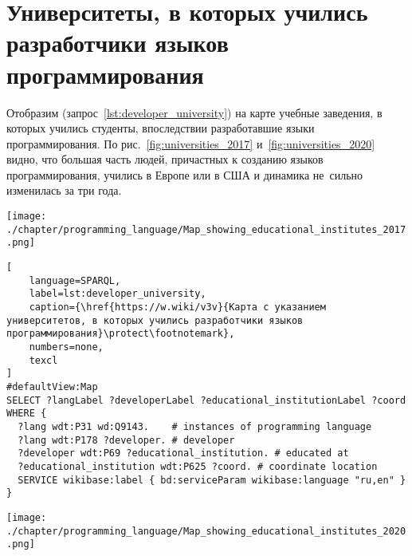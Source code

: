 \section{Университеты, в которых учились разработчики языков программирования}


Отобразим (запрос~\ref{lst:developer_university}) на карте учебные заведения, в которых учились студенты, впоследствии разработавшие языки программирования.
По рис.~\ref{fig:universities_2017} и~\ref{fig:universities_2020} видно, что большая часть людей, причастных к созданию языков программирования, учились в Европе или в США и динамика не~сильно изменилась за три года.
%
\begin{marginfigure}[3\baselineskip]
\centering
	\texttt{[image: ./chapter/programming\_language/Map\_showing\_educational\_institutes\_2017.png]}
	\caption[Учебные заведения, в которых учились разработчики языков программирования, 2017 год.]{Учебные заведения, в которых учились разработчики языков программирования, 2017 год. Ссылка на SPARQL-запрос: \href{https://w.wiki/uGb}{https://w.wiki/uGb}}
	\label{fig:universities_2017}
\end{marginfigure}


\begin{lstlisting}[
	language=SPARQL,
	label=lst:developer_university,
	caption={\href{https://w.wiki/v3v}{Карта с указанием университетов, в которых учились разработчики языков программирования}\protect\footnotemark},
    numbers=none,
	texcl
]
#defaultView:Map
SELECT ?langLabel ?developerLabel ?educational_institutionLabel ?coord 
WHERE {
  ?lang wdt:P31 wd:Q9143.    # instances of programming language
  ?lang wdt:P178 ?developer. # developer
  ?developer wdt:P69 ?educational_institution. # educated at
  ?educational_institution wdt:P625 ?coord. # coordinate location
  SERVICE wikibase:label { bd:serviceParam wikibase:language "ru,en" }
}
\end{lstlisting}

\begin{marginfigure}[1\baselineskip]
\centering
	\texttt{[image: ./chapter/programming\_language/Map\_showing\_educational\_institutes\_2020.png]}
	\caption[Учебные заведения, в которых учились разработчики языков программирования, 2020 год.]{Учебные заведения, в которых учились разработчики языков программирования, 2020 год. Ссылка на SPARQL-запрос: \href{https://w.wiki/uGb}{https://w.wiki/uGb}}
	\label{fig:universities_2020}
\end{marginfigure}



